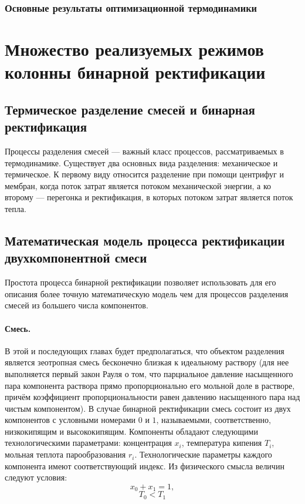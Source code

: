 \documentclass{article}
\begin{document}
		\subsubsection{Основные результаты оптимизационной термодинамики}

\section{Множество реализуемых режимов колонны бинарной ректификации}

	\subsection{Термическое разделение смесей и бинарная ректификация}
	
	Процессы разделения смесей --- важный класс процессов, рассматриваемых в термодинамике. Существует два основных вида разделения: механическое и термическое. К первому виду относится разделение при помощи центрифуг и мембран, когда поток затрат является потоком механической энергии, а ко второму --- перегонка и ректификация, в которых потоком затрат является поток тепла.

	\subsection{Математическая модель процесса ректификации двухкомпонентной смеси}
	
	Простота процесса бинарной ректификации позволяет использовать для его описания более точную математическую модель чем для процессов разделения смесей из большего числа компонентов.
	
	\paragraph{Смесь.} В этой и последующих главах будет предполагаться, что объектом разделения является зеотропная смесь бесконечно близкая к идеальному раствору (для нее выполняется первый закон Рауля о том, что парциальное давление насыщенного пара компонента раствора прямо пропорционально его мольной доле в растворе, причём коэффициент пропорциональности равен давлению насыщенного пара над чистым компонентом). В случае бинарной ректификации смесь состоит из двух компонентов с условными номерами $0$ и $1$, называемыми, соответственно, низкокипящим и высококипящим. Компоненты обладают следующими технологическими параметрами: концентрация $x_i$, температура кипения $T_i$, мольная теплота парообразования $r_i$. Технологические параметры каждого компонента имеют соответствующий индекс. Из физического смысла величин следуют условия:
	\[
	x_0 + x_1 = 1,
	\]
	\[
	T_0 < T_1
	\]
	
\end{document}
